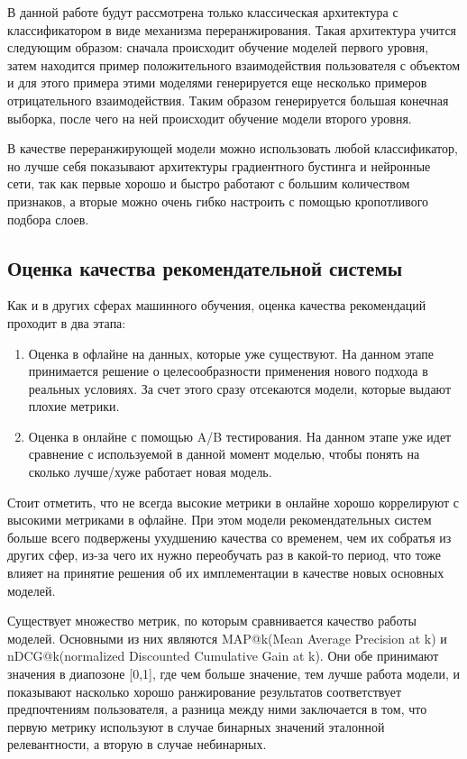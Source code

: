 \documentclass[bachelor, och, coursework]{SCWorks}
\begin{document}
В данной работе будут рассмотрена только классическая архитектура с классификатором в виде механизма
переранжирования. Такая архитектура учится следующим образом: сначала происходит обучение моделей первого уровня,
затем находится пример положительного взаимодействия пользователя
с объектом и для этого примера этими моделями генерируется еще несколько примеров отрицательного
взаимодействия. Таким образом генерируется большая конечная выборка, после чего на ней происходит обучение
модели второго уровня.

В качестве переранжирующей модели можно использовать любой классификатор, но лучше себя показывают архитектуры
градиентного бустинга и нейронные сети, так как первые хорошо и быстро работают с большим количеством признаков,
а вторые можно очень гибко настроить с помощью кропотливого подбора слоев.

\subsection{Оценка качества рекомендательной системы}

Как и в других сферах машинного обучения, оценка качества рекомендаций проходит в два этапа:

\begin{enumerate}
    \item Оценка в офлайне на данных, которые уже существуют. На данном этапе принимается решение о
    целесообразности применения нового подхода в реальных условиях. За счет этого сразу отсекаются
    модели, которые выдают плохие метрики.
    \item Оценка в онлайне с помощью A/B тестирования. На данном этапе уже идет сравнение с используемой
    в данной момент моделью, чтобы понять на сколько лучше/хуже работает новая модель.
\end{enumerate}

Стоит отметить, что не всегда высокие метрики в онлайне хорошо коррелируют с высокими метриками в офлайне.
При этом модели рекомендательных систем больше всего подвержены ухудшению качества со временем, чем их собратья
из других сфер, из-за чего их нужно переобучать раз в какой-то период, что тоже влияет на принятие решения
об их имплементации в качестве новых основных моделей.

Существует множество метрик, по которым сравнивается качество работы моделей. Основными из них являются 
MAP@k(Mean Average Precision at k) и nDCG@k(normalized Discounted Cumulative Gain at k). Они обе принимают значения в диапозоне [0,1],
где чем больше значение, тем лучше работа модели, и показывают
насколько хорошо ранжирование результатов соответствует предпочтениям пользователя, а разница между ними заключается
в том, что первую метрику используют в случае бинарных значений эталонной релевантности, а вторую в случае
небинарных.
\end{document}
